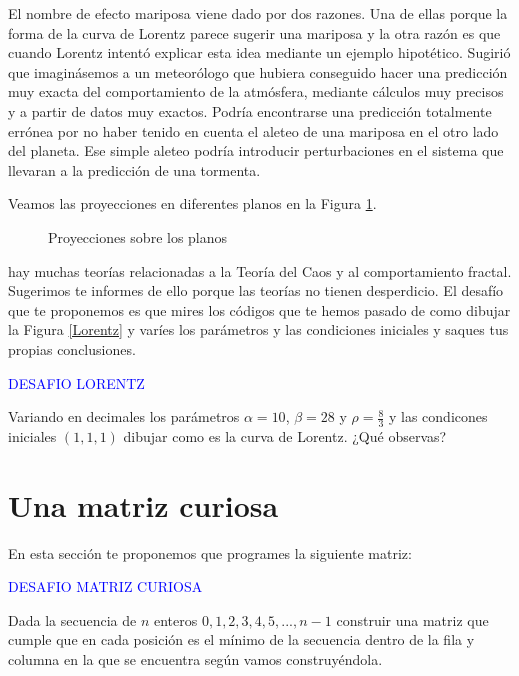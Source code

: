 El nombre de efecto mariposa viene dado por dos razones. Una de ellas porque la forma de la curva de Lorentz parece sugerir una mariposa y la otra razón es que cuando Lorentz intentó explicar esta idea mediante un ejemplo hipotético. Sugirió que imaginásemos a un meteorólogo que hubiera conseguido hacer una predicción muy exacta del comportamiento de la
atmósfera, mediante cálculos muy precisos y a partir de datos muy exactos. Podría encontrarse una
predicción totalmente errónea por no haber tenido en cuenta el aleteo de una mariposa en el otro
lado del planeta. Ese simple aleteo podría introducir perturbaciones en el sistema que llevaran a la predicción de una tormenta. 

Veamos las proyecciones en diferentes planos en la Figura \ref{proyecciones}.

\begin{figure}[ht!]
\centering \scalebox{0.4}{}\caption{Proyecciones sobre los planos}\label{proyecciones}
\end{figure}

hay muchas teorías relacionadas a la Teoría del Caos y al comportamiento fractal. Sugerimos te informes de ello porque las teorías no tienen desperdicio. El desafío que te proponemos es que mires los códigos que te hemos pasado de como dibujar la Figura \ref{Lorentz} y varíes los parámetros y las condiciones iniciales y saques tus propias conclusiones.

\begin{mybox}
  \begin{center}\textcolor{blue}{DESAFIO LORENTZ}\end{center}

  Variando en decimales los parámetros $\alpha=10$, $\beta=28$ y $\rho=\frac{8}{3}$ y las condicones iniciales $(1,1,1)$ dibujar como es la curva de Lorentz. ¿Qué observas?
\end{mybox}


\section{Una matriz curiosa}
En esta sección te proponemos que programes la siguiente matriz:
\begin{mybox}
  \begin{center}\textcolor{blue}{DESAFIO MATRIZ CURIOSA}\end{center}
   Dada la secuencia de $n$ enteros $0,1,2,3,4,5,...,n-1$ construir una matriz que cumple que en cada posición es el mínimo de la secuencia dentro de la fila y columna en la que se encuentra según vamos construyéndola.
\end{mybox}

